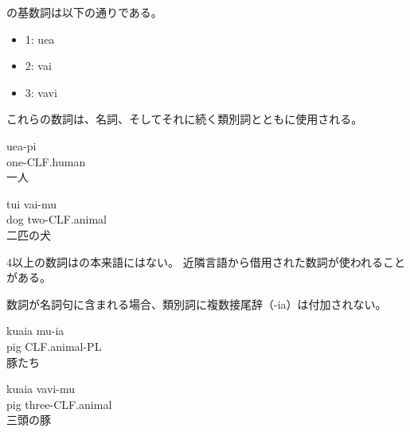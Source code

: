 \langname の基数詞は以下の通りである。
\begin{itemize}
    \item 1: uea
    \item 2: vai
    \item 3: vavi
\end{itemize}

これらの数詞は、名詞、そしてそれに続く類別詞とともに使用される。
\begin{exe}
    \ex \gll uea-pi \\
    one-CLF.human \\
    \glt 一人
\end{exe}

\begin{exe}
    \ex \gll tui vai-mu \\
    dog two-CLF.animal \\
    \glt 二匹の犬
\end{exe}

4以上の数詞は\langname の本来語にはない。
近隣言語から借用された数詞が使われることがある。


数詞が名詞句に含まれる場合、類別詞に複数接尾辞（-ia）は付加されない。
\begin{exe}
    \ex \gll kuaia mu-ia \\
    pig CLF.animal-PL \\
    \glt 豚たち
\end{exe}
\begin{exe}
    \ex \gll kuaia vavi-mu \\
    pig three-CLF.animal \\
    \glt 三頭の豚
\end{exe}
